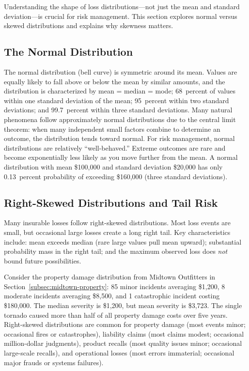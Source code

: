 \documentclass[11pt,openany]{book}
\begin{document}
Understanding the shape of loss distributions---not just the mean and standard
deviation---is crucial for risk management. This section explores normal versus
skewed distributions and explains why skewness matters.

\subsection{The Normal Distribution}
\label{subsec:normal-distribution}

The normal distribution (bell curve) is symmetric around its mean. Values are
equally likely to fall above or below the mean by similar amounts, and the
distribution is characterized by mean = median = mode; 68~percent of values
within one standard deviation of the mean; 95~percent within two standard
deviations; and 99.7~percent within three standard deviations. Many natural
phenomena follow approximately normal distributions due to the central limit
theorem: when many independent small factors combine to determine an outcome,
the distribution tends toward normal. For risk management, normal distributions
are relatively ``well-behaved.'' Extreme outcomes are rare and become
exponentially less likely as you move further from the mean. A normal
distribution with mean \$100,000 and standard deviation \$20,000 has only
0.13~percent probability of exceeding \$160,000 (three standard deviations).

\subsection{Right-Skewed Distributions and Tail Risk}
\label{subsec:right-skewed}

Many insurable losses follow right-skewed distributions. Most loss events are
small, but occasional large losses create a long right tail. Key characteristics
include: mean exceeds median (rare large values pull mean upward); substantial
probability mass in the right tail; and the maximum observed loss does
\emph{not} bound future possibilities.

Consider the property damage distribution from Midtown Outfitters in
Section~\ref{subsec:midtown-property}: 85 minor incidents averaging \$1,200,
8 moderate incidents averaging \$8,500, and 1 catastrophic incident costing
\$180,000. The median severity is \$1,200, but mean severity is \$3,723. The
single tornado caused more than half of all property damage costs over five
years. Right-skewed distributions are common for property damage (most events
minor; occasional fires or catastrophes), liability claims (most claims modest;
occasional million-dollar judgments), product recalls (most quality issues
minor; occasional large-scale recalls), and operational losses (most errors
immaterial; occasional major frauds or systems failures).
\end{document}
